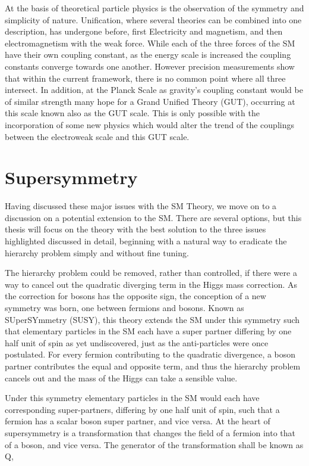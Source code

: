 At the basis of theoretical particle physics is the observation of the symmetry and simplicity of nature. Unification, where several theories can be combined into one description,  has undergone before, first Electricity and magnetism, and then electromagnetism with the weak force. While each of the three forces of the SM have their own coupling constant, as the energy scale is increased the coupling constants converge towards one another. However precision measurements show that within the current framework,  there is no common point where all three intersect. In addition, at the Planck Scale as gravity's coupling constant would be of similar strength many hope for a Grand Unified Theory (GUT),  occurring at this scale known also as the GUT scale. This is only possible with the incorporation of some new physics which would alter the trend of the couplings between the electroweak scale and this GUT scale. 



\section{Supersymmetry}

Having discussed these major issues with the SM Theory, we move on to a discussion on a potential extension to the SM. There are several options, but this thesis will focus on the theory with the best solution to the three issues highlighted discussed in detail, beginning with a natural way to eradicate the hierarchy problem simply and without fine tuning.

The hierarchy problem could be removed, rather than controlled, if there were a way to cancel out the quadratic diverging term in the Higgs mass correction. As the correction for bosons has the opposite sign, the conception of a new symmetry was born, one between fermions and bosons. Known as SUperSYmmetry (SUSY), this theory extends the SM under this symmetry such that elementary particles in the SM each have a super partner differing by one half unit of spin as yet undiscovered, just as the anti-particles were once postulated. For every fermion contributing to the quadratic divergence, a boson partner contributes the equal and opposite term, and thus the hierarchy problem cancels out and the mass of the Higgs can take a sensible value.

Under this symmetry elementary particles in the SM would each have corresponding super-partners, differing by one half unit of spin, such that a fermion has a scalar boson super partner, and vice versa. At the heart of supersymmetry is a transformation that changes the field of a fermion into that of a boson, and vice versa. The generator of the transformation shall be known as Q,


